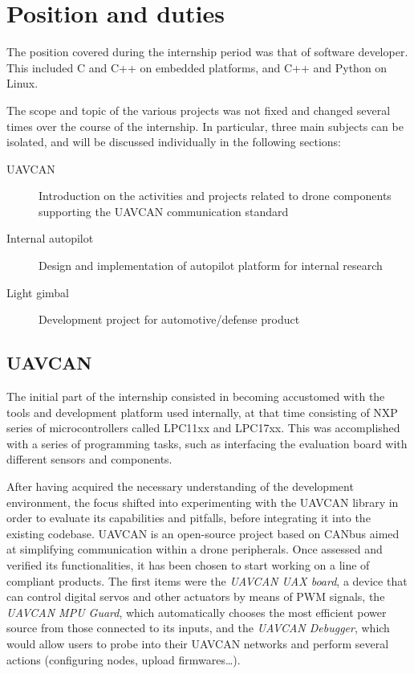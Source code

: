 \section{Position and duties}
The position covered during the internship period was that of software developer.
This included C and C++ on embedded platforms, and C++ and Python on Linux.

The scope and topic of the various projects was not fixed and changed several times over the course of the internship.
In particular, three main subjects can be isolated, and will be discussed individually in the following sections:

\begin{description}
\item [UAVCAN] Introduction on the activities and projects related to drone components supporting the UAVCAN communication standard
\item [Internal autopilot] Design and implementation of autopilot platform for internal research
\item [Light gimbal] Development project for automotive/defense product
\end{description}


\subsection{UAVCAN}
The initial part of the internship consisted in becoming accustomed with the tools and development platform used internally, at that time consisting of NXP series of microcontrollers called LPC11xx and LPC17xx.
This was accomplished with a series of programming tasks, such as interfacing the evaluation board with different sensors and components.

After having acquired the necessary understanding of the development environment, the focus shifted into experimenting with the UAVCAN library in order to evaluate its capabilities and pitfalls, before integrating it into the existing codebase.
UAVCAN is an open-source project based on CANbus aimed at simplifying communication within a drone peripherals.
Once assessed and verified its functionalities, it has been chosen to start working on a line of compliant products.
The first items were the \emph{UAVCAN UAX board}, a device that can control digital servos and other actuators by means of PWM signals, the \emph{UAVCAN MPU Guard}, which automatically chooses the most efficient power source from those connected to its inputs, and the \emph{UAVCAN Debugger}, which would allow users to probe into their UAVCAN networks and perform several actions (configuring nodes, upload firmwares\dots).

